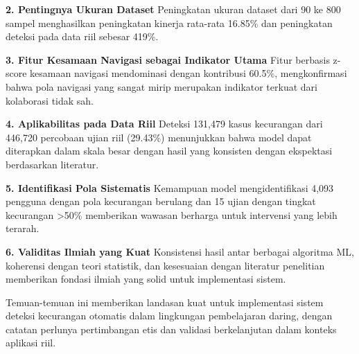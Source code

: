 \textbf{2. Pentingnya Ukuran Dataset}
Peningkatan ukuran dataset dari 90 ke 800 sampel menghasilkan peningkatan kinerja rata-rata 16.85\% dan peningkatan deteksi pada data riil sebesar 419\%.

\textbf{3. Fitur Kesamaan Navigasi sebagai Indikator Utama}
Fitur berbasis z-score kesamaan navigasi mendominasi dengan kontribusi 60.5\%, mengkonfirmasi bahwa pola navigasi yang sangat mirip merupakan indikator terkuat dari kolaborasi tidak sah.

\textbf{4. Aplikabilitas pada Data Riil}
Deteksi 131,479 kasus kecurangan dari 446,720 percobaan ujian riil (29.43\%) menunjukkan bahwa model dapat diterapkan dalam skala besar dengan hasil yang konsisten dengan ekspektasi berdasarkan literatur.

\textbf{5. Identifikasi Pola Sistematis}
Kemampuan model mengidentifikasi 4,093 pengguna dengan pola kecurangan berulang dan 15 ujian dengan tingkat kecurangan >50\% memberikan wawasan berharga untuk intervensi yang lebih terarah.

\textbf{6. Validitas Ilmiah yang Kuat}
Konsistensi hasil antar berbagai algoritma ML, koherensi dengan teori statistik, dan kesesuaian dengan literatur penelitian memberikan fondasi ilmiah yang solid untuk implementasi sistem.

Temuan-temuan ini memberikan landasan kuat untuk implementasi sistem deteksi kecurangan otomatis dalam lingkungan pembelajaran daring, dengan catatan perlunya pertimbangan etis dan validasi berkelanjutan dalam konteks aplikasi riil. 